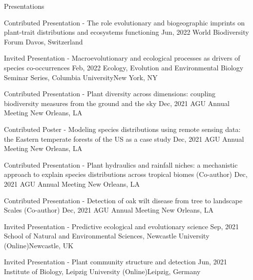 \documentclass{resume} %
\begin{document}
\begin{rSection}{Presentations}
\begin{sSubsection}{Contributed Presentation - The role evolutionary and biogeographic imprints on plant-trait distributions and ecosystems functioning}{ \hfill }{Jun, 2022}{ World Biodiversity Forum }{Davos, Switzerland}
\end{sSubsection}

\begin{sSubsection}{Invited Presentation - Macroevolutionary and ecological processes as drivers of species co-occurrences}{ \hfill }{Feb, 2022}{ Ecology, Evolution and Environmental Biology Seminar Series, Columbia University}{New York, NY}
\end{sSubsection}

\begin{sSubsection}{Contributed Presentation - Plant diversity across dimensions: coupling biodiversity measures from the ground and the sky}{ \hfill }{Dec, 2021}{ AGU Annual Meeting }{New Orleans, LA}
\end{sSubsection}

\begin{sSubsection}{Contributed Poster - Modeling species distributions using remote sensing data: the Eastern temperate forests of the US as a case study}{ }{Dec, 2021}{ AGU Annual Meeting }{New Orleans, LA}
\end{sSubsection}

\begin{sSubsection}{Contributed Presentation - Plant hydraulics and rainfall niches: a mechanistic approach to explain species distributions across tropical biomes}{ (Co-author) }{Dec, 2021}{ AGU Annual Meeting }{New Orleans, LA}
\end{sSubsection}

\begin{sSubsection}{Contributed Presentation - Detection of oak wilt disease from tree to landscape Scales}{ (Co-author) }{Dec, 2021}{ AGU Annual Meeting }{New Orleans, LA}
\end{sSubsection}

\begin{sSubsection}{Invited Presentation - Predictive ecological and evolutionary science}{ }{Sep, 2021}{ School of Natural and Environmental Sciences, Newcastle University (Online)}{Newcastle, UK}
\end{sSubsection}

\begin{sSubsection}{Invited Presentation - Plant community structure and detection}{ }{Jun, 2021}{ Institute of Biology, Leipzig University (Online)}{Leipzig, Germany}
\end{sSubsection}


\end{rSection}
\end{document}
